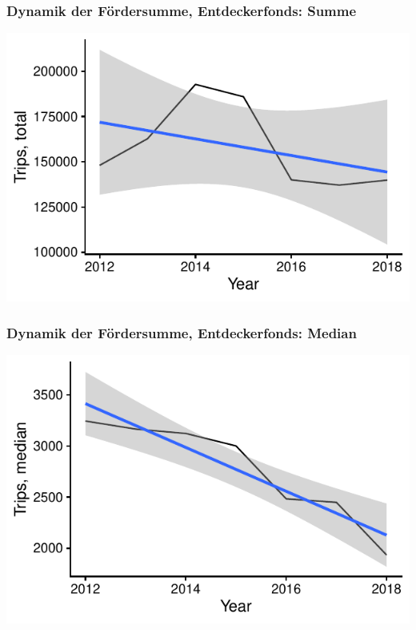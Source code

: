 \begin{frame}[fragile]
\frametitle{Dynamik der Fördersumme, Entdeckerfonds: Summe}



{\centering \includegraphics[width=\maxwidth]{figure/beamer-FundamentalDynamicsTripsTotal-1} 

}



\end{frame}

\begin{frame}[fragile]
\frametitle{Dynamik der Fördersumme, Entdeckerfonds: Median}



{\centering \includegraphics[width=\maxwidth]{figure/beamer-FundamentalDynamicsTripsMedian-1} 

}



\end{frame}


